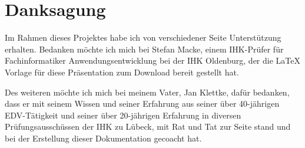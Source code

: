 \cleardoublepage

\section{Danksagung}
\label{sec:Danksagung}
Im Rahmen dieses Projektes habe ich von verschiedener Seite Unterstützung erhalten. Bedanken möchte ich mich bei Stefan Macke, einem IHK-Prüfer für Fachinformatiker Anwendungsentwicklung bei der IHK Oldenburg, der die LaTeX Vorlage für diese Präsentation zum Download bereit gestellt hat.

Des weiteren möchte ich mich bei meinem Vater, Jan Klettke, dafür bedanken, dass er mit seinem Wissen und seiner Erfahrung aus seiner über 40-jährigen EDV-Tätigkeit und seiner über 20-jährigen Erfahrung in diversen Prüfungsausschüssen der IHK zu Lübeck, mit Rat und Tat zur Seite stand und bei der Erstellung dieser Dokumentation gecoacht hat.